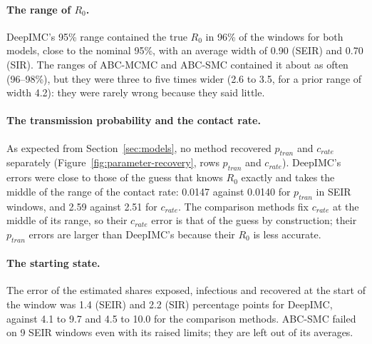\documentclass[12pt]{article}
\begin{document}
\paragraph{The range of $R_0$.} DeepIMC's 95\% range contained the true $R_0$ in 96\% of the windows for
both models, close to the nominal 95\%, with an average width of 0.90 (SEIR) and 0.70 (SIR). The ranges of
ABC-MCMC and ABC-SMC contained it about as often (96--98\%), but they were three to five times wider
(2.6 to 3.5, for a prior range of width 4.2): they were rarely wrong because they said little.

\paragraph{The transmission probability and the contact rate.} As expected from
Section~\ref{sec:models}, no method recovered $p_{tran}$ and $c_{rate}$ separately
(Figure~\ref{fig:parameter-recovery}, rows $p_{tran}$ and $c_{rate}$). DeepIMC's errors were close to
those of the guess that knows $R_0$ exactly and takes the middle of the range of the contact rate:
0.0147 against 0.0140 for $p_{tran}$ in SEIR windows, and 2.59 against 2.51 for $c_{rate}$. The comparison
methods fix $c_{rate}$ at the middle of its range, so their $c_{rate}$ error is that of the guess by
construction; their $p_{tran}$ errors are larger than DeepIMC's because their $R_0$ is less accurate.

\paragraph{The starting state.} The error of the estimated shares exposed, infectious and recovered at
the start of the window was 1.4 (SEIR) and 2.2 (SIR) percentage points for DeepIMC, against 4.1 to 9.7
and 4.5 to 10.0 for the comparison methods. ABC-SMC failed on 9 SEIR windows even with its raised limits;
they are left out of its averages.

\begin{table}[htbp]
\centering
\caption{Parameter recovery on the 10,000 simulated test windows (5,000 per model). MAE of $R_0$ for all
windows and for early, middle and late windows; for the methods that give a 95\% range of $R_0$, the
percentage of windows whose range contains the true value and the average width of the range; MAE of
$p_{tran}$ and $c_{rate}$, with the error of a guess that knows $R_0$ exactly and takes the middle of the
range of $c_{rate}$; starting-state error (percentage points). Bold: lowest error. The comparison methods
fix $c_{rate}$ at the middle of its range, so their $c_{rate}$ error is that of the guess.}
\label{tab:sim-parameters}
\small
\resizebox{\textwidth}{!}{}
\end{table}
\end{document}

